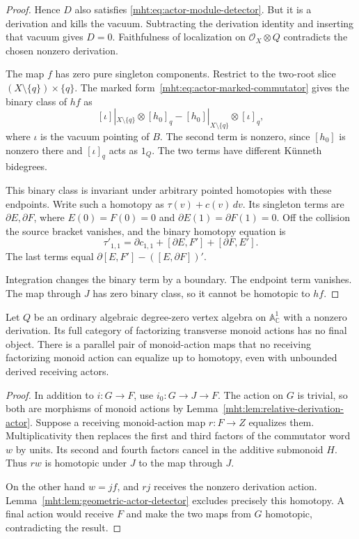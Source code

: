 \begin{proof}
Hence $D$ also satisfies
\eqref{mht:eq:actor-module-detector}. But it is
a derivation and kills the vacuum. Subtracting
the derivation identity and inserting that
vacuum gives $D=0$. Faithfulness of localization
on $\mathcal O_X\otimes Q$ contradicts the
chosen nonzero derivation.

The map $f$ has zero pure singleton components.
Restrict to the two-root slice
$(X\setminus\{q\})\times\{q\}$.
The marked form~\eqref{mht:eq:actor-marked-commutator}
gives the binary class of $hf$ as
\[
 [\iota]|_{X\setminus\{q\}}\otimes[h_0]_q
       -[h_0]|_{X\setminus\{q\}}\otimes[\iota]_q,
\]
where $\iota$ is the vacuum pointing of $B$.
The second term is nonzero, since $[h_0]$ is
nonzero there and $[\iota]_q$ acts as $1_Q$.
The two terms have different K\"unneth bidegrees.

This binary class is invariant under arbitrary
pointed homotopies with these endpoints. Write
such a homotopy as $\tau(v)+c(v)\,dv$. Its
singleton terms are $\partial E,\partial F$,
where $E(0)=F(0)=0$ and
$\partial E(1)=\partial F(1)=0$. Off the
collision the source bracket vanishes, and the
binary homotopy equation is
\[
 \tau'_{1,1}=\partial c_{1,1}
              +[\partial E,F']+[\partial F,E'].
\]
The last terms equal
$\partial[E,F']-([E,\partial F])'$.

Integration changes the binary term by a boundary. The endpoint term vanishes. The map through $J$
has zero binary class, so it cannot be homotopic
to $hf$.
\end{proof}

\begin{theorem}\label{mht:thm:ordinary-actor-nonfinality}
Let $Q$ be an ordinary algebraic degree-zero vertex algebra
on $\mathbb A^1_{\mathbb C}$ with a nonzero derivation.
Its full category of factorizing transverse monoid actions
has no final object.
There is a parallel pair of monoid-action maps
that no receiving factorizing monoid action can
equalize up to homotopy, even with unbounded
derived receiving actors.
\end{theorem}

\begin{proof}
In addition to $i:G\to F$, use
$i_0:G\to J\to F$. The action on $G$ is trivial,
so both are morphisms of monoid actions by
Lemma~\ref{mht:lem:relative-derivation-actor}.
Suppose a receiving monoid-action map $r:F\to Z$
equalizes them. Multiplicativity then replaces
the first and third factors of the commutator
word $w$ by units. Its second and fourth factors
cancel in the additive submonoid $H$. Thus
$rw$ is homotopic under $J$ to the map through
$J$.

On the other hand $w=jf$, and $rj$ receives
the nonzero derivation action. Lemma~\ref{mht:lem:geometric-actor-detector}
excludes precisely this homotopy. A final action
would receive $F$ and make the two maps from
$G$ homotopic, contradicting the result.
\end{proof}


